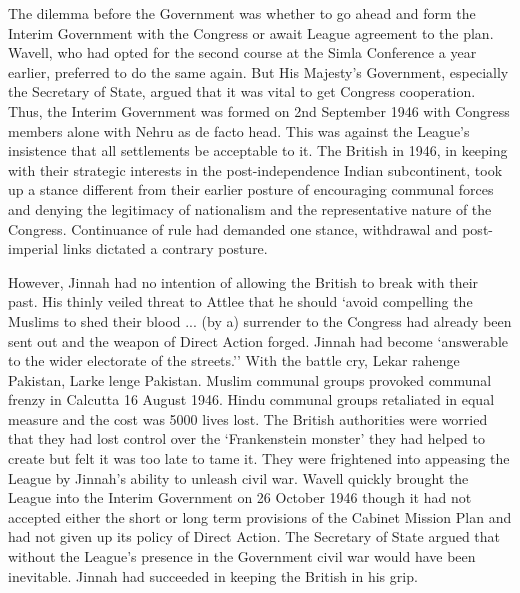 \begin{multicols}{2}
The dilemma before the Government was whether to go ahead and form the Interim Government with the Congress or await League agreement to the plan. Wavell, who had opted for the second course at the Simla Conference a year earlier, preferred to do the same again. But His Majesty's Government, especially the Secretary of State, argued that it was vital to get Congress cooperation. Thus, the Interim Government was formed on 2nd September 1946 with Congress members alone with Nehru as de facto head. This was against the League's insistence that all settlements be acceptable to it. The British in 1946, in keeping with their strategic interests in the post-independence Indian subcontinent, took up a stance different from their earlier posture of encouraging communal forces and denying the legitimacy of nationalism and the representative nature of the Congress. Continuance of rule had demanded one stance, withdrawal and post-imperial links dictated a contrary posture. 

However, Jinnah had no intention of allowing the British to break with their past. His thinly veiled threat to Attlee that he should `avoid compelling the Muslims to shed their blood ... (by a) surrender to the Congress had already been sent out and the weapon of Direct Action forged. Jinnah had become `answerable to the wider electorate of the streets.'' With the battle cry, Lekar rahenge Pakistan, Larke lenge Pakistan. Muslim communal groups provoked communal frenzy in Calcutta 16 August 1946. Hindu communal groups retaliated in equal measure and the cost was 5000 lives lost. The British authorities were worried that they had lost control over the `Frankenstein monster' they had helped to create but felt it was too late to tame it. They were frightened into appeasing the League by Jinnah's ability to unleash civil war. Wavell quickly brought the League into the Interim Government on 26 October 1946 though it had not accepted either the short or long term provisions of the Cabinet Mission Plan and had not given up its policy of Direct Action. The Secretary of State argued that without the League's presence in the Government civil war would have been inevitable. Jinnah had succeeded in keeping the British in his grip. 


\end{multicols}
